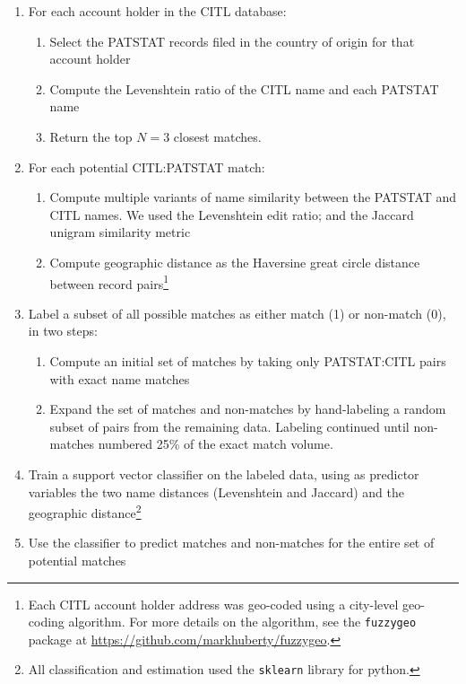 \documentclass[11pt]{article}
\begin{document}
\begin{enumerate}
\item For each account holder in the CITL database:
  \begin{enumerate}
  \item Select the PATSTAT records filed in the country of origin for
    that account holder
  \item Compute the Levenshtein ratio of the CITL name and each
    PATSTAT name
  \item Return the top $N=3$ closest matches. 
  \end{enumerate}
\item For each potential CITL:PATSTAT match:
  \begin{enumerate}
  \item Compute multiple variants of name similarity between the
    PATSTAT and CITL names. We used the
    Levenshtein edit ratio; and the Jaccard unigram similarity metric
  \item Compute geographic distance as the Haversine great circle
    distance between record pairs\footnote{Each CITL account holder address was
      geo-coded using a city-level geo-coding algorithm. For more
      details on the algorithm, see the \texttt{fuzzygeo} package at \url{https://github.com/markhuberty/fuzzygeo}.}
  \end{enumerate}
\item Label a subset of all possible matches as either match (1) or
  non-match (0), in two steps:
  \begin{enumerate}
  \item Compute an initial set of matches by taking only PATSTAT:CITL
    pairs with exact name matches
  \item Expand the set of matches and non-matches by hand-labeling a
    random subset of pairs from the remaining data. Labeling continued
    until non-matches numbered 25\% of the exact match volume.
  \end{enumerate}
\item Train a support vector classifier on the labeled data, using as
  predictor variables the two name distances (Levenshtein and Jaccard)
  and the geographic distance\footnote{All classification and
    estimation used the \texttt{sklearn} library for python.}
\item Use the classifier to predict matches and
  non-matches for the entire set of potential matches
\end{enumerate}
\end{document}
